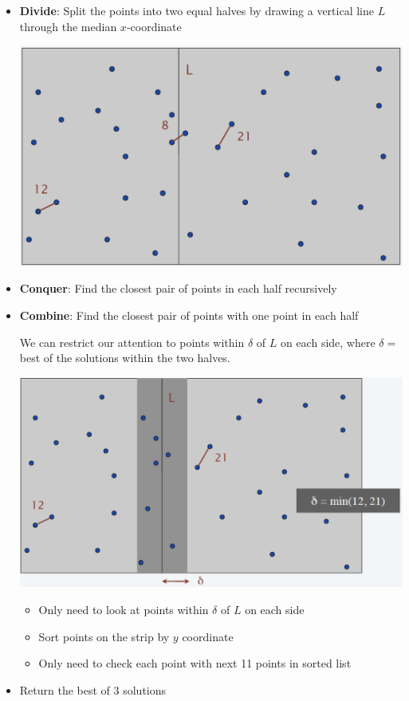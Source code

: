 \begin{itemize}
    \item \textbf{Divide}: Split the points into two equal halves by drawing a vertical line $L$ through the median $x$-coordinate

    \begin{center} \includegraphics[width=0.55\linewidth]{figures/Closest Pair Divide.png} \end{center}

    \item \textbf{Conquer}: Find the closest pair of points in each half recursively

    \item \textbf{Combine}: Find the closest pair of points with one point in each half

    We can restrict our attention to points within $\delta$ of $L$ on each side, where $\delta = $ best of the solutions within the two halves. 

    \begin{center} \includegraphics[width=0.55\linewidth]{figures/Closest Pair Conquer.png} \end{center}

    \begin{itemize}
        \item Only need to look at points within $\delta$ of $L$ on each side
        \item Sort points on the strip by $y$ coordinate
        \item Only need to check each point with next 11 points in sorted list
    \end{itemize}

    \item Return the best of 3 solutions
\end{itemize}

